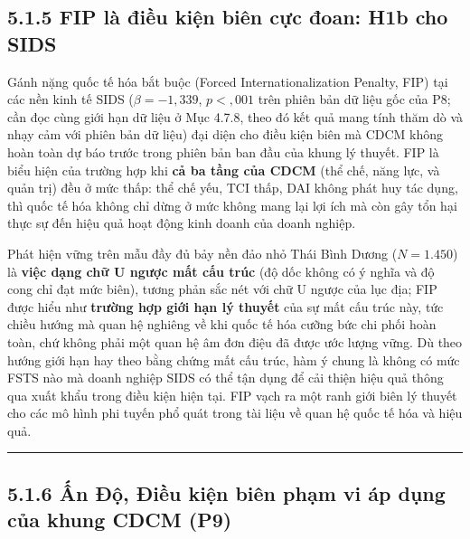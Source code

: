 \documentclass[
  a4paper,
  13pt]{extreport}
\begin{document}
\hypertarget{fip-luxe0-ux111iux1ec1u-kiux1ec7n-biuxean-cux1ef1c-ux111oan-h1b-cho-sids}{%
\subsection{5.1.5 FIP là điều kiện biên cực đoan: H1b cho
SIDS}\label{fip-luxe0-ux111iux1ec1u-kiux1ec7n-biuxean-cux1ef1c-ux111oan-h1b-cho-sids}}

Gánh nặng quốc tế hóa bắt buộc (Forced Internationalization Penalty,
FIP) tại các nền kinh tế SIDS (\(\beta = -1{,}339\), \(p < {,}001\) trên
phiên bản dữ liệu gốc của P8; cần đọc cùng giới hạn dữ liệu ở Mục 4.7.8,
theo đó kết quả mang tính thăm dò và nhạy cảm với phiên bản dữ liệu) đại
diện cho điều kiện biên mà CDCM không hoàn toàn dự báo trước trong phiên
bản ban đầu của khung lý thuyết. FIP là biểu hiện của trường hợp khi
\textbf{cả ba tầng của CDCM} (thể chế, năng lực, và quản trị) đều ở mức
thấp: thể chế yếu, TCI thấp, DAI không phát huy tác dụng, thì quốc tế
hóa không chỉ dừng ở mức không mang lại lợi ích mà còn gây tổn hại thực
sự đến hiệu quả hoạt động kinh doanh của doanh nghiệp.

Phát hiện vững trên mẫu đầy đủ bảy nền đảo nhỏ Thái Bình Dương
(\(N = 1.450\)) là \textbf{việc dạng chữ U ngược mất cấu trúc} (độ dốc
không có ý nghĩa và độ cong chỉ đạt mức biên), tương phản sắc nét với
chữ U ngược của lục địa; FIP được hiểu như \textbf{trường hợp giới hạn
lý thuyết} của sự mất cấu trúc này, tức chiều hướng mà quan hệ nghiêng
về khi quốc tế hóa cưỡng bức chi phối hoàn toàn, chứ không phải một quan
hệ âm đơn điệu đã được ước lượng vững. Dù theo hướng giới hạn hay theo
bằng chứng mất cấu trúc, hàm ý chung là không có mức FSTS nào mà doanh
nghiệp SIDS có thể tận dụng để cải thiện hiệu quả thông qua xuất khẩu
trong điều kiện hiện tại. FIP vạch ra một ranh giới biên lý thuyết cho
các mô hình phi tuyến phổ quát trong tài liệu về quan hệ quốc tế hóa và
hiệu quả.

\begin{center}\rule{0.5\linewidth}{0.5pt}\end{center}

\hypertarget{ux1ea5n-ux111ux1ed9-ux111iux1ec1u-kiux1ec7n-biuxean-phux1ea1m-vi-uxe1p-dux1ee5ng-cux1ee7a-khung-cdcm-p9}{%
\subsection{5.1.6 Ấn Độ, Điều kiện biên phạm vi áp dụng của khung CDCM
(P9)}\label{ux1ea5n-ux111ux1ed9-ux111iux1ec1u-kiux1ec7n-biuxean-phux1ea1m-vi-uxe1p-dux1ee5ng-cux1ee7a-khung-cdcm-p9}}
\end{document}
